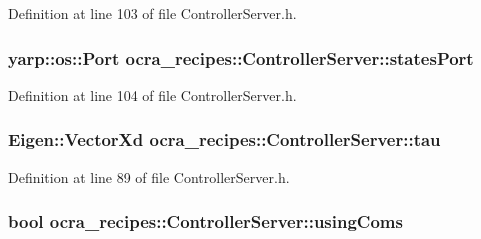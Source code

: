 Definition at line 103 of file Controller\+Server.\+h.

\subsubsection[{\texorpdfstring{states\+Port}{statesPort}}]{\setlength{\rightskip}{0pt plus 5cm}yarp\+::os\+::\+Port ocra\+\_\+recipes\+::\+Controller\+Server\+::states\+Port\hspace{0.3cm}{\ttfamily [protected]}}\hypertarget{classocra__recipes_1_1ControllerServer_a1d314027131262206280be3e728bf59f}{}\label{classocra__recipes_1_1ControllerServer_a1d314027131262206280be3e728bf59f}


Definition at line 104 of file Controller\+Server.\+h.

\subsubsection[{\texorpdfstring{tau}{tau}}]{\setlength{\rightskip}{0pt plus 5cm}Eigen\+::\+Vector\+Xd ocra\+\_\+recipes\+::\+Controller\+Server\+::tau\hspace{0.3cm}{\ttfamily [protected]}}\hypertarget{classocra__recipes_1_1ControllerServer_a07e10b62b84a999c14843662a378ec0f}{}\label{classocra__recipes_1_1ControllerServer_a07e10b62b84a999c14843662a378ec0f}


Definition at line 89 of file Controller\+Server.\+h.

\subsubsection[{\texorpdfstring{using\+Coms}{usingComs}}]{\setlength{\rightskip}{0pt plus 5cm}bool ocra\+\_\+recipes\+::\+Controller\+Server\+::using\+Coms\hspace{0.3cm}{\ttfamily [protected]}}\hypertarget{classocra__recipes_1_1ControllerServer_a7f7559e938ca0e3cfff4833d86ef5b54}{}\label{classocra__recipes_1_1ControllerServer_a7f7559e938ca0e3cfff4833d86ef5b54}


